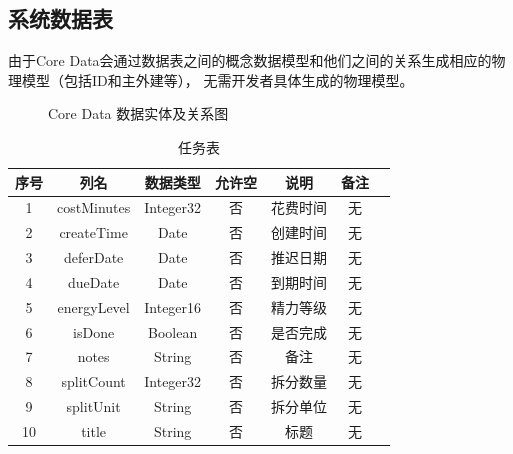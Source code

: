 \subsection{系统数据表}
由于Core Data会通过数据表之间的概念数据模型和他们之间的关系生成相应的物理模型（包括ID和主外建等），
无需开发者具体生成的物理模型。

\begin{figure}[H]
	\centering
	\caption{Core Data 数据实体及关系图}
\end{figure}

\begin{table}[H]
  \centering
  \caption{任务表}
  \begin{tabular}{ccccccc} \toprule
	序号 & 列名 & 数据类型 & 允许空 & 说明 & 备注 \\
	\midrule
	1 & costMinutes & Integer32 & 否 & 花费时间 & 无 \\
	2 & createTime & Date & 否 & 创建时间 & 无 \\
	3 & deferDate & Date & 否 & 推迟日期 & 无 \\
	4 & dueDate & Date & 否 & 到期时间 & 无 \\
	5 & energyLevel & Integer16 & 否 & 精力等级 & 无 \\
	6 & isDone & Boolean & 否 & 是否完成 & 无 \\
	7 & notes & String & 否 & 备注 & 无 \\
	8 & splitCount & Integer32 & 否 & 拆分数量 & 无 \\
	9 & splitUnit & String & 否 & 拆分单位 & 无 \\
	10 & title & String & 否 & 标题 & 无 \\
	\bottomrule
  \end{tabular}
\end{table}

